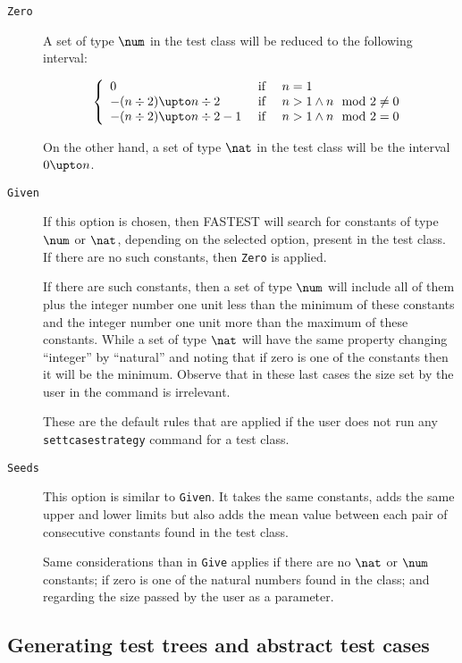 \begin{description}
\item[{\tt Zero}] A set of type $\num$ in the test class will be reduced to the following interval:

\[
\left\{
\begin{array}{lll}
0  & \text{ if } & n = 1 \\
-(n \div 2) \upto n \div 2 & \text{ if } & n > 1 \land n \mod 2 \neq 0 \\
-(n \div 2) \upto n \div 2 -1 & \text{ if } & n > 1 \land n \mod 2 = 0 \\
\end{array}
\right.
\]

On the other hand, a set of type $\nat$ in the test class will be the interval $0 \upto n$.

\item[{\tt Given}] If this option is chosen, then FASTEST will search for constants of type $\num$ or $\nat$, depending on the selected option, present in the test class. If there are no such constants, then \verb+Zero+ is applied. 

If there are such constants, then a set of type $\num$ will include all of them plus the integer number one unit less than the minimum of these constants and the integer number one unit more than the maximum of these constants. While a set of type $\nat$ will have the same property changing ``integer'' by ``natural'' and noting that if zero is one of the constants then it will be the minimum. Observe that in these last cases the size set by the user in the command is irrelevant.

These are the default rules that are applied if the user does not run any \verb+settcasestrategy+ command for a test class.

\item[{\tt Seeds}] This option is similar to \verb+Given+. It takes the same constants, adds the same upper and lower limits but also adds the mean value between each pair of consecutive constants found in the test class.

Same considerations than in \verb+Give+ applies if there are no $\nat$ or $\num$ constants; if zero is one of the natural numbers found in the class; and regarding the size passed by the user as a parameter.
\end{description}


\subsection{Generating test trees and abstract test cases}

